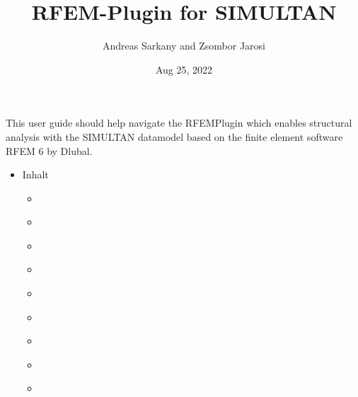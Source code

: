 \documentclass[letterpaper,10pt,english]{jupyterBook}
\title{RFEM-Plugin for SIMULTAN}
\date{Aug 25, 2022}
\author{Andreas Sarkany and Zsombor Jarosi}
\begin{document}
\pagestyle{empty}
\sphinxmaketitle
\pagestyle{plain}
\sphinxtableofcontents
\pagestyle{normal}
\label{\detokenize{intro::doc}}


\sphinxAtStartPar
This user guide should help navigate the RFEM\sphinxhyphen{}Plugin which enables structural analysis with the SIMULTAN datamodel based
on the finite element software RFEM 6 by Dlubal.
\begin{itemize}
\item {} 
\sphinxAtStartPar
Inhalt

\begin{itemize}
\item {} 
\sphinxAtStartPar
{\hyperref[\detokenize{Introduction::doc}]{}}

\item {} 
\sphinxAtStartPar
{\hyperref[\detokenize{Getting_started_with_the_RFem_Plugin::doc}]{}}

\item {} 
\sphinxAtStartPar
{\hyperref[\detokenize{Setting_up_a_problem::doc}]{}}

\item {} 
\sphinxAtStartPar
{\hyperref[\detokenize{Running_a_simulation::doc}]{}}

\item {} 
\sphinxAtStartPar
{\hyperref[\detokenize{Results_of_the_simulation::doc}]{}}

\item {} 
\sphinxAtStartPar
{\hyperref[\detokenize{Connecting_an_existing_model_to_the_RFem_Plugin::doc}]{}}

\item {} 
\sphinxAtStartPar
{\hyperref[\detokenize{SIMULTAN_Datastructure_to_incorporate_the_RFem_Data_model::doc}]{}}

\item {} 
\sphinxAtStartPar
{\hyperref[\detokenize{LICENSE::doc}]{}}

\item {} 
\sphinxAtStartPar
{\hyperref[\detokenize{References::doc}]{}}

\end{itemize}
\end{itemize}
\end{document}
